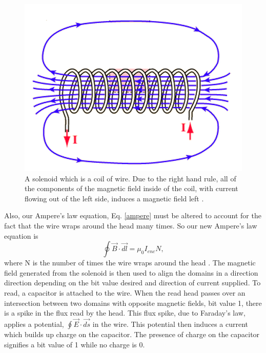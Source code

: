 \documentclass[ notitlepage, numerical, 11pt]{revtex4-1} %
\begin{document}
\begin{figure}[H]
\centerline{\includegraphics[scale=.8]{solenoid.png}}
\caption{A solenoid which is a coil of wire. Due to the right hand rule, all of the components of the magnetic field inside of the coil, with current flowing out of the left side, induces a magnetic field left \cite{hyperSolenoid}.}
\label{solenoid}
\end{figure}
Also, our Ampere's law equation, Eq. \ref{ampere} must be altered to account for the fact that the wire wraps around the head many times. So our new Ampere's law equation is
\begin{equation}
\oint \vec{B}\cdot \vec{dl} = \mu_0 I_{enc}N,
\label{ampere2}
\end{equation}
where N is the number of times the wire wraps around the head \cite{purcell}.
The magnetic field generated from the solenoid is then used to align the domains in a direction direction depending on the bit value desired and direction of current supplied. To read, a capacitor is attached to the wire. When the read head passes over an intersection between two domains with opposite magnetic fields, bit value 1, there is a spike in the flux read by the head. This flux spike, due to Faraday's law, applies a potential, $\oint \vec{E}\cdot \vec{ds}$  in the wire. This potential then induces a current which builds up charge on the capacitor. The presence of charge on the capacitor signifies a bit value of 1 while no charge is 0.
\end{document}
